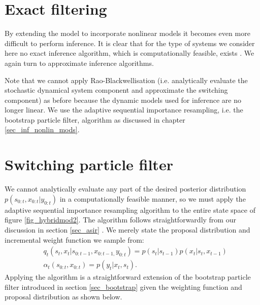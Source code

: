 \section{Exact filtering}
By extending the model to incorporate nonlinear models it becomes even more difficult to perform inference. It is clear that for the type of systems we consider here no exact inference algorithm, which is computationally feasible, exists \cite{murphy1}. We again turn to approximate inference algorithms.

Note that we cannot apply Rao-Blackwellisation (i.e. analytically evaluate the stochastic dynamical system component and approximate the switching component) as before because the dynamic models used for inference are no longer linear. We use the adaptive sequential importance resampling, i.e. the bootstrap particle filter, algorithm as discussed in chapter \ref{sec_inf_nonlin_mods}.
\section{Switching particle filter}
We cannot analytically evaluate any part of the desired posterior distribution $p(s_{0:t}, x_{0:t}|y_{0:t})$ in a computationally feasible manner, so we must apply the adaptive sequential importance resampling algorithm to the entire state space of figure \ref{fig_hybridmod2}. The algorithm follows straightforwardly from our discussion in section \ref{sec_asir} \cite{murphy1}. We merely state the proposal distribution and incremental weight function we sample from:
\begin{equation}
\begin{aligned}
&q_t(s_t,x_t|s_{0:t-1},x_{0:t-1,}y_{0:t}) = p(s_t|s_{t-1})p(x_t|s_t,x_{t-1}) \\
&\alpha_t(s_{0:t},x_{0:t}) = p(y_t|x_t,s_t).
\end{aligned}
\label{eq_nonpf}
\end{equation}  
Applying the algorithm is a straightforward extension of the bootstrap particle filter introduced in section \ref{sec_bootstrap} given the weighting function and proposal distribution as shown below.

